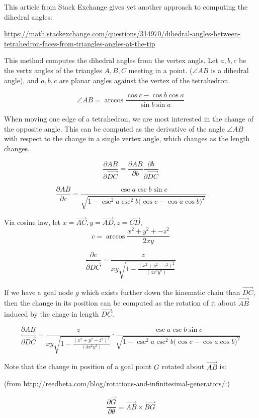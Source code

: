\documentclass[11pt]{article}
\begin{document}
This article from Stack Exchange gives yet another approach to computing the
dihedral angles:

\url{https://math.stackexchange.com/questions/314970/dihedral-angles-between-tetrahedron-faces-from-triangles-angles-at-the-tip}

This method computes the dihedral angles from the vertex angls. Let $a,b,c$ be the
vertx angles of the triangles $A,B,C$ meeting in a point. ($\angle AB$ is a dihedral angle), and $a,b,c$ are planar angles against the vertex of the
tetrahedron.

\[
\angle AB =\arccos{\frac{\cos{c} - \cos{b}\cos{a}}{\sin{b}\sin{a}}}
\]

When moving one edge of a tetrahedron, we are most interested in the change of
the opposite angle. This can be computed as the derivative of the angle $\angle AB$
with respect to the change in a single vertex angle, which changes as the length
changes.

\[
\frac{\partial AB }{\partial \overrightarrow{DC}}   =  \frac{\partial AB }{\partial b} \frac{\partial b}{\partial \overrightarrow{DC}} 
\]

\[
\frac{\partial AB }{\partial c} =
\frac{\csc{a} \csc{b} \sin{c}}
 {\sqrt{1 - \csc^2{a} \csc^2{b} \big( \cos{c} - \cos{a} \cos{b}\big)^2}}
\]

Via cosine law, let $x = \overrightarrow{AC}, y = \overrightarrow{AD}, z = \overrightarrow{CD}$,
\[
c = \arccos{\frac{x^2 + y^2 + -z^2}{2xy}}
\]

\[
\frac{\partial c}{\partial \overrightarrow{DC}} = \frac{z}{x y \sqrt{1 -
    \frac{(x^2 + y^2 - z^2)^2}{(4 x^2 y^2)}}}
\]


If we have a goal node $g$ which exists further down the kinematic chain than $\overrightarrow{DC}$, then
the change in its position can be computed as the rotation of it about $\overrightarrow{AB}$ induced by the
chage in length $\overrightarrow{DC}$.

\[
\frac{\partial AB }{\partial \overrightarrow{DC}}  =
\frac{z}{x y \sqrt{1 -
    \frac{(x^2 + y^2 - z^2)^2}{(4 x^2 y^2)}}}
\cdot
\frac{\csc{a} \csc{b} \sin{c}}
 {\sqrt{1 - \csc^2{a} \csc^2{b} \big( \cos{c} - \cos{a} \cos{b}\big)^2}}
 \]

 Note that the change in position of a goal point $G$ rotated about $\overrightarrow{AB}$ is:

(from \url{http://reedbeta.com/blog/rotations-and-infinitesimal-generators/}:)

\[
\frac{\partial \overrightarrow{G}}{\partial \theta} = \overrightarrow{AB} \times \overrightarrow{BG}
\]
\end{document}
